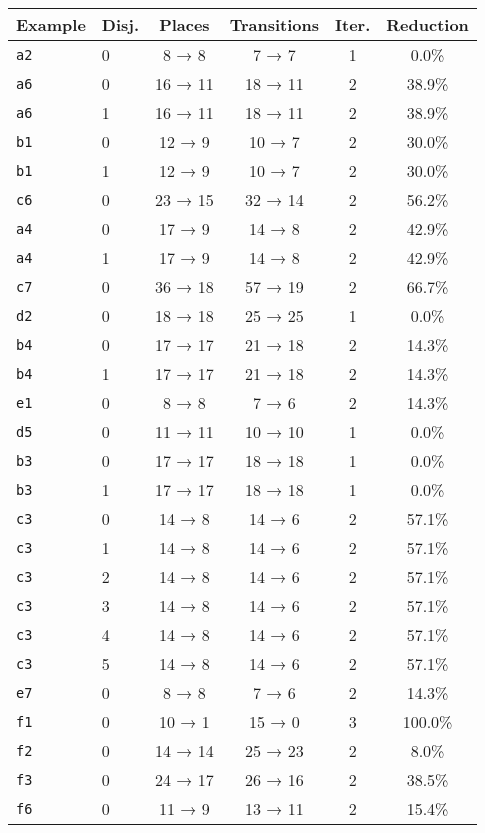 \begin{tabular}{llcccc}
\toprule
Example & Disj. & Places & Transitions & Iter. & Reduction \\
\midrule
\texttt{a2} & 0 & 8 → 8 & 7 → 7 & 1 & 0.0\% \\
\texttt{a6} & 0 & 16 → 11 & 18 → 11 & 2 & 38.9\% \\
\texttt{a6} & 1 & 16 → 11 & 18 → 11 & 2 & 38.9\% \\
\texttt{b1} & 0 & 12 → 9 & 10 → 7 & 2 & 30.0\% \\
\texttt{b1} & 1 & 12 → 9 & 10 → 7 & 2 & 30.0\% \\
\texttt{c6} & 0 & 23 → 15 & 32 → 14 & 2 & 56.2\% \\
\texttt{a4} & 0 & 17 → 9 & 14 → 8 & 2 & 42.9\% \\
\texttt{a4} & 1 & 17 → 9 & 14 → 8 & 2 & 42.9\% \\
\texttt{c7} & 0 & 36 → 18 & 57 → 19 & 2 & 66.7\% \\
\texttt{d2} & 0 & 18 → 18 & 25 → 25 & 1 & 0.0\% \\
\texttt{b4} & 0 & 17 → 17 & 21 → 18 & 2 & 14.3\% \\
\texttt{b4} & 1 & 17 → 17 & 21 → 18 & 2 & 14.3\% \\
\texttt{e1} & 0 & 8 → 8 & 7 → 6 & 2 & 14.3\% \\
\texttt{d5} & 0 & 11 → 11 & 10 → 10 & 1 & 0.0\% \\
\texttt{b3} & 0 & 17 → 17 & 18 → 18 & 1 & 0.0\% \\
\texttt{b3} & 1 & 17 → 17 & 18 → 18 & 1 & 0.0\% \\
\texttt{c3} & 0 & 14 → 8 & 14 → 6 & 2 & 57.1\% \\
\texttt{c3} & 1 & 14 → 8 & 14 → 6 & 2 & 57.1\% \\
\texttt{c3} & 2 & 14 → 8 & 14 → 6 & 2 & 57.1\% \\
\texttt{c3} & 3 & 14 → 8 & 14 → 6 & 2 & 57.1\% \\
\texttt{c3} & 4 & 14 → 8 & 14 → 6 & 2 & 57.1\% \\
\texttt{c3} & 5 & 14 → 8 & 14 → 6 & 2 & 57.1\% \\
\texttt{e7} & 0 & 8 → 8 & 7 → 6 & 2 & 14.3\% \\
\texttt{f1} & 0 & 10 → 1 & 15 → 0 & 3 & 100.0\% \\
\texttt{f2} & 0 & 14 → 14 & 25 → 23 & 2 & 8.0\% \\
\texttt{f3} & 0 & 24 → 17 & 26 → 16 & 2 & 38.5\% \\
\texttt{f6} & 0 & 11 → 9 & 13 → 11 & 2 & 15.4\% \\

\end{tabular}
